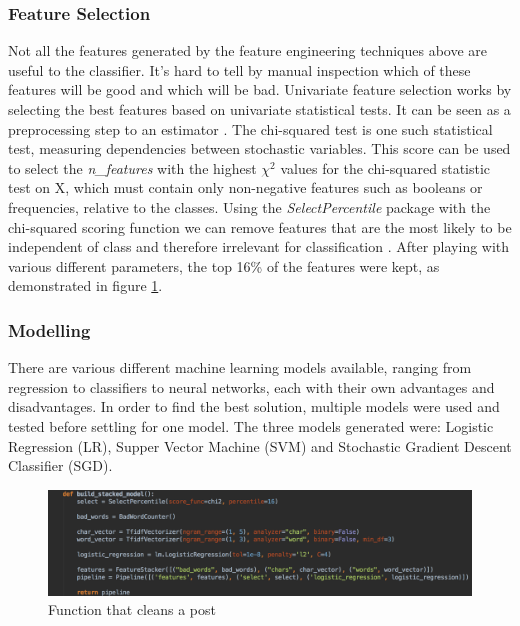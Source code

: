 \subsubsection{Feature Selection}
Not all the features generated by the feature engineering techniques above are useful to the classifier. It's hard to tell by manual inspection which of these features will be good and which will be bad. Univariate feature selection works by selecting the best features based on univariate statistical tests. It can be seen as a preprocessing step to an estimator \cite{Scikit:FeatureSelection}. The chi-squared test is one such statistical test, measuring dependencies between stochastic variables. This score can be used to select the \emph{n\_features} with the highest $\chi^2$ values for the chi-squared statistic test on X, which must contain only non-negative features such as booleans or frequencies, relative to the classes. Using the \textit{SelectPercentile} package with the chi-squared scoring function we can remove features that are the most likely to be independent of class and therefore irrelevant for classification \cite{Scikit:SelectPercentile, Scikit:ChiSquared}. After playing with various different parameters, the top 16\% of the features were kept, as demonstrated in figure \ref{fig:AbuseDetection-Modelling}.

\subsubsection{Modelling}
There are various different machine learning models available, ranging from regression to classifiers to neural networks, each with their own advantages and disadvantages. In order to find the best solution, multiple models were used and tested before settling for one model. The three models generated were: Logistic Regression (LR), Supper Vector Machine (SVM) and Stochastic Gradient Descent Classifier (SGD).

\begin{figure}[H]
	\centering
	\includegraphics[width=\textwidth]{Images/Implementation/DataProcessing/AbuseDetection/Modelling}
	\caption{Function that cleans a post}
	\label{fig:AbuseDetection-Modelling}
\end{figure}

